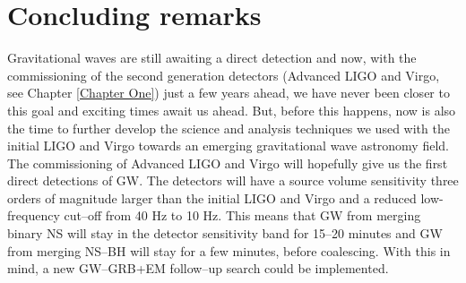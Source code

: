 \chapter{Concluding remarks} %
\label{Conclusions}

Gravitational waves are still awaiting a direct detection and now, with the commissioning of the second generation detectors (Advanced LIGO and Virgo, see Chapter \ref{Chapter One}) just a few years ahead, we have never been closer to this goal and exciting times await us ahead. But, before this happens, now is also the time to further develop the science and analysis techniques we used with the initial LIGO and Virgo towards an emerging gravitational wave astronomy field. The commissioning of Advanced LIGO and Virgo will hopefully give us the first direct detections of GW. The detectors will have a source volume sensitivity three orders of magnitude larger than the initial LIGO and Virgo and a reduced low-frequency cut--off from 40 Hz to 10 Hz. This means that GW from merging binary NS will stay in the detector sensitivity band for 15--20 minutes and GW from merging NS--BH will stay for a few minutes, before coalescing. With this in mind, a new GW--GRB+EM follow--up search could be implemented.


